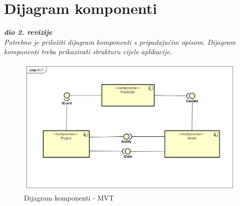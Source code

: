 			 \eject
			
			\eject
		\section{Dijagram komponenti}
		
			\textbf{\textit{dio 2. revizije}}\\
		
			 \textit{Potrebno je priložiti dijagram komponenti s pripadajućim opisom. Dijagram komponenti treba prikazivati strukturu cijele aplikacije.}

			\begin{figure}[H]
			 	\includegraphics[width= 15 cm, height= 15 cm, keepaspectratio]{dijagrami/Component_Diagram_MVT.png} 
			 	\centering
			 	\caption{Dijagram komponenti - MVT}
			 	\label{fig:act4}
			 \end{figure}

